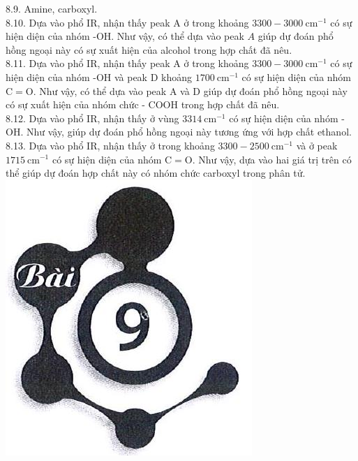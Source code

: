 \documentclass[10pt]{article}
\begin{document}
8.9. Amine, carboxyl.\\
8.10. Dựa vào phổ IR, nhận thấy peak A ở trong khoảng $3300-3000 \mathrm{~cm}^{-1}$ có sự hiện diện của nhóm -OH. Như vậy, có thể dựa vào peak $A$ giúp dự đoán phổ hồng ngoại này có sự xuất hiện của alcohol trong hợp chất đã nêu.\\
8.11. Dựa vào phổ IR, nhận thấy peak A ở trong khoảng $3300-3000 \mathrm{~cm}^{-1}$ có sự hiện diện của nhóm -OH và peak D khoảng $1700 \mathrm{~cm}^{-1}$ có sự hiện diện của nhóm $\mathrm{C}=\mathrm{O}$. Như vậy, có thể dựa vào peak A và D giúp dự đoán phổ hồng ngoại này có sự xuất hiện của nhóm chức - COOH trong hợp chất đã nêu.\\
8.12. Dựa vào phổ IR, nhận thấy ở vùng $3314 \mathrm{~cm}^{-1}$ có sự hiện diện của nhóm -OH. Như vậy, giúp dự đoán phổ hồng ngoại này tương ứng với hợp chất ethanol.\\
8.13. Dựa vào phổ IR, nhận thấy ở trong khoảng $3300-2500 \mathrm{~cm}^{-1}$ và ở peak $1715 \mathrm{~cm}^{-1}$ có sự hiện diện của nhóm $\mathrm{C}=\mathrm{O}$. Như vậy, dựa vào hai giá trị trên có thể giúp dự đoán hợp chất này có nhóm chức carboxyl trong phân tử.\\
\includegraphics[max width=\textwidth, center]{2025_10_23_adad5b98d65ac6665838g-14}
\end{document}
